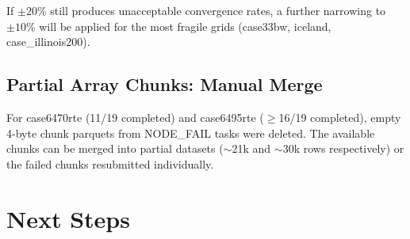 \documentclass{article}
\begin{document}
If $\pm20\%$ still produces unacceptable convergence rates, a further
narrowing to $\pm10\%$ will be applied for the most fragile grids
(case33bw, iceland, case\_illinois200).


\subsection{Partial Array Chunks: Manual Merge}

For case6470rte (11/19 completed) and case6495rte ($\geq$16/19 completed),
empty 4-byte chunk parquets from NODE\_FAIL tasks were deleted.
The available chunks can be merged into partial datasets ($\sim$21k and
$\sim$30k rows respectively) or the failed chunks resubmitted individually.


\section{Next Steps}
\label{sec:next}
\end{document}
